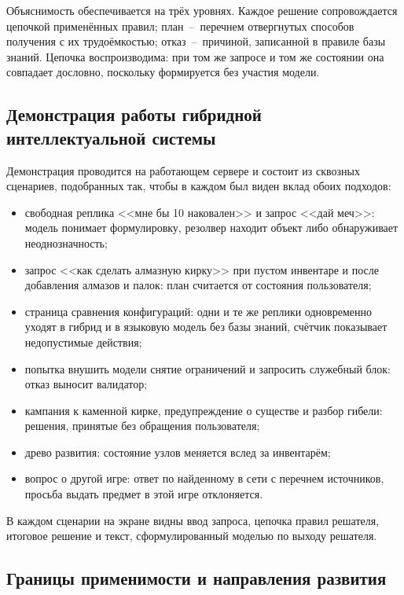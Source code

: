 Объяснимость обеспечивается на трёх уровнях. Каждое решение сопровождается цепочкой
применённых правил; план~--~перечнем отвергнутых способов получения с их трудоёмкостью;
отказ~--~причиной, записанной в правиле базы знаний. Цепочка воспроизводима: при том же
запросе и том же состоянии она совпадает дословно, поскольку формируется без участия
модели.

\subsection{Демонстрация работы гибридной интеллектуальной системы}

Демонстрация проводится на работающем сервере и состоит из сквозных сценариев,
подобранных так, чтобы в каждом был виден вклад обоих подходов:

\begin{itemize}
  \item свободная реплика <<мне бы 10 наковален>> и запрос <<дай меч>>: модель понимает
        формулировку, резолвер находит объект либо обнаруживает неоднозначность;
  \item запрос <<как сделать алмазную кирку>> при пустом инвентаре и после добавления
        алмазов и палок: план считается от состояния пользователя;
  \item страница сравнения конфигураций: одни и те же реплики одновременно уходят в
        гибрид и в языковую модель без базы знаний, счётчик показывает недопустимые
        действия;
  \item попытка внушить модели снятие ограничений и запросить служебный блок: отказ
        выносит валидатор;
  \item кампания к каменной кирке, предупреждение о существе и разбор гибели: решения,
        принятые без обращения пользователя;
  \item древо развития: состояние узлов меняется вслед за инвентарём;
  \item вопрос о другой игре: ответ по найденному в сети с перечнем источников, просьба
        выдать предмет в этой игре отклоняется.
\end{itemize}

В каждом сценарии на экране видны ввод запроса, цепочка правил решателя, итоговое
решение и текст, сформулированный моделью по выходу решателя.

\subsection{Границы применимости и направления развития}

